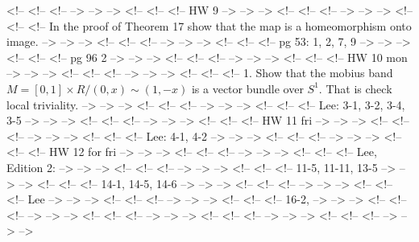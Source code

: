 \documentclass{amsart}
\numberwithin{equation}{section}
\theoremstyle{definition}
\theoremstyle{remark}
\begin{document}
<!-- <!-- <!--  --> --> -->
<!-- <!-- <!-- HW 9 --> --> -->
<!-- <!-- <!--  --> --> -->
<!-- <!-- <!-- In the proof of Theorem 17 show that the map is a homeomorphism onto image. --> --> -->
<!-- <!-- <!--  --> --> -->
<!-- <!-- <!-- pg 53: 1, 2, 7, 9   --> --> -->
<!-- <!-- <!-- pg 96 2   --> --> -->
<!-- <!-- <!--  --> --> -->
<!-- <!-- <!-- HW 10 mon --> --> -->
<!-- <!-- <!--  --> --> -->
<!-- <!-- <!-- 1. Show that the mobius band $M=[0,1] \times R /(0,x) \sim (1,-x)$ is a vector bundle over $S^1$. That is check local triviality.   --> --> -->
<!-- <!-- <!--  --> --> -->
<!-- <!-- <!-- Lee: 3-1, 3-2, 3-4, 3-5   --> --> -->
<!-- <!-- <!--  --> --> -->
<!-- <!-- <!-- HW 11 fri --> --> -->
<!-- <!-- <!--  --> --> -->
<!-- <!-- <!-- Lee: 4-1, 4-2   --> --> -->
<!-- <!-- <!--  --> --> -->
<!-- <!-- <!-- HW 12 for fri --> --> -->
<!-- <!-- <!--  --> --> -->
<!-- <!-- <!-- Lee, Edition 2: --> --> -->
<!-- <!-- <!--  --> --> -->
<!-- <!-- <!-- 11-5,  11-11, 13-5   --> --> -->
<!-- <!-- <!-- 14-1, 14-5, 14-6   --> --> -->
<!-- <!-- <!--  --> --> -->
<!-- <!-- <!-- Lee --> --> -->
<!-- <!-- <!--  --> --> -->
<!-- <!-- <!-- 16-2,  --> --> -->
<!-- <!-- <!--  --> --> -->
<!-- <!-- <!--  --> --> -->
<!-- <!-- <!--  --> --> -->
<!-- <!-- <!--  --> --> -->


\end{document}
